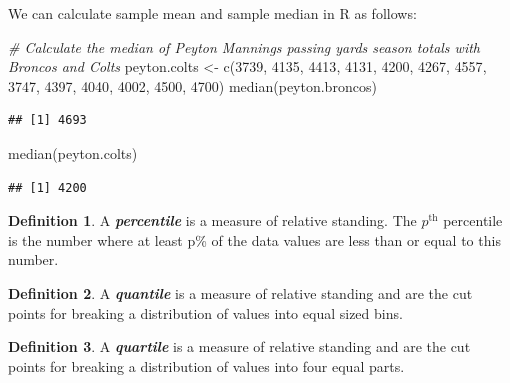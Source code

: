 \documentclass[
]{book}
\newenvironment{Shaded}{\begin{snugshade}}{\end{snugshade}}
\newcommand{\CommentTok}[1]{\textcolor[rgb]{0.56,0.35,0.01}{\textit{#1}}}
\newcommand{\DecValTok}[1]{\textcolor[rgb]{0.00,0.00,0.81}{#1}}
\newcommand{\FunctionTok}[1]{\textcolor[rgb]{0.00,0.00,0.00}{#1}}
\newcommand{\NormalTok}[1]{#1}
\newcommand{\OtherTok}[1]{\textcolor[rgb]{0.56,0.35,0.01}{#1}}
\theoremstyle{definition}
\newtheorem{definition}{Definition}[chapter]
\theoremstyle{definition}
\theoremstyle{definition}
\theoremstyle{definition}
\theoremstyle{remark}
\begin{document}
We can calculate sample mean and sample median in R as follows:

\begin{Shaded}
\begin{Highlighting}[]
\CommentTok{\# Calculate the median of Peyton Manning\textquotesingle{}s passing yards season totals with Broncos and Colts}
\NormalTok{peyton.colts }\OtherTok{\textless{}{-}} \FunctionTok{c}\NormalTok{(}\DecValTok{3739}\NormalTok{, }\DecValTok{4135}\NormalTok{, }\DecValTok{4413}\NormalTok{, }\DecValTok{4131}\NormalTok{, }\DecValTok{4200}\NormalTok{, }\DecValTok{4267}\NormalTok{, }\DecValTok{4557}\NormalTok{, }\DecValTok{3747}\NormalTok{, }\DecValTok{4397}\NormalTok{, }\DecValTok{4040}\NormalTok{, }\DecValTok{4002}\NormalTok{, }\DecValTok{4500}\NormalTok{, }\DecValTok{4700}\NormalTok{)}
\FunctionTok{median}\NormalTok{(peyton.broncos)}
\end{Highlighting}
\end{Shaded}

\begin{verbatim}
## [1] 4693
\end{verbatim}

\begin{Shaded}
\begin{Highlighting}[]
\FunctionTok{median}\NormalTok{(peyton.colts)}
\end{Highlighting}
\end{Shaded}

\begin{verbatim}
## [1] 4200
\end{verbatim}

\begin{definition}
A \textbf{\emph{percentile}} is a measure of relative standing. The \(p^\text{th}\) percentile is the number where at least
p\% of the data values are less than or equal to this number.
\end{definition}

\begin{definition}
A \textbf{\emph{quantile}} is a measure of relative standing and are the cut points for breaking a distribution of values into equal sized bins.
\end{definition}

\begin{definition}
A \textbf{\emph{quartile}} is a measure of relative standing and are the cut points for breaking a distribution of values into four equal parts.
\end{definition}
\end{document}
